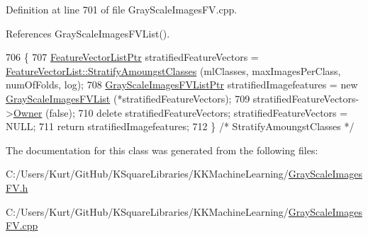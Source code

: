 Definition at line 701 of file Gray\+Scale\+Images\+F\+V.\+cpp.



References Gray\+Scale\+Images\+F\+V\+List().


\begin{DoxyCode}
706 \{
707   \hyperlink{class_k_k_m_l_l_1_1_feature_vector_list}{FeatureVectorListPtr}  stratifiedFeatureVectors = 
      \hyperlink{class_k_k_m_l_l_1_1_feature_vector_list_a10271db5b9466f45bb3ec138a05f209d}{FeatureVectorList::StratifyAmoungstClasses} (mlClasses, 
      maxImagesPerClass, numOfFolds, log);
708   \hyperlink{class_k_k_m_l_l_1_1_gray_scale_images_f_v_list}{GrayScaleImagesFVListPtr}  stratifiedImagefeatures  = \textcolor{keyword}{new} 
      \hyperlink{class_k_k_m_l_l_1_1_gray_scale_images_f_v_list_aabed2fbe6de7f052cc63dc941a863372}{GrayScaleImagesFVList} (*stratifiedFeatureVectors);
709   stratifiedFeatureVectors->\hyperlink{class_k_k_b_1_1_k_k_queue_a4990d037ff09dd504cc7df53819bf61a}{Owner} (\textcolor{keyword}{false});
710   \textcolor{keyword}{delete} stratifiedFeatureVectors;  stratifiedFeatureVectors = NULL;
711   \textcolor{keywordflow}{return}  stratifiedImagefeatures;
712 \}  \textcolor{comment}{/* StratifyAmoungstClasses */}
\end{DoxyCode}


The documentation for this class was generated from the following files\+:\begin{DoxyCompactItemize}
\item 
C\+:/\+Users/\+Kurt/\+Git\+Hub/\+K\+Square\+Libraries/\+K\+K\+Machine\+Learning/\hyperlink{_gray_scale_images_f_v_8h}{Gray\+Scale\+Images\+F\+V.\+h}\item 
C\+:/\+Users/\+Kurt/\+Git\+Hub/\+K\+Square\+Libraries/\+K\+K\+Machine\+Learning/\hyperlink{_gray_scale_images_f_v_8cpp}{Gray\+Scale\+Images\+F\+V.\+cpp}\end{DoxyCompactItemize}
